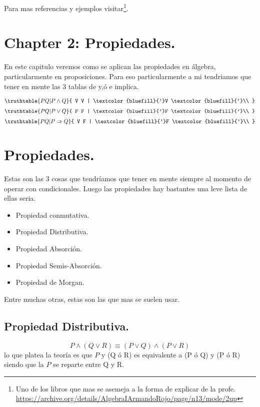 \documentclass{article}
\newcommand{\bs}{\textcolor{bluefill}{'}}
\begin{document}
Para mas referencias y ejemplos visitar\footnote{Uno de los libros que mas se asemeja a la forma de explicar de la profe. \\
\url{https://archive.org/details/AlgebraIArmandoRojo/page/n13/mode/2up}}.



 \section*{Chapter 2: Propiedades.}

En este capitulo veremos como se aplican las propiedades en álgebra, particularmente en proposiciones.
Para eso particularmente a mi tendriamos que tener en mente las 3 tablas de y,ó e implica.

\begin{center}
	\[
	\truthtable{
		P Q | P \land Q
	}{  V V | \bs V \bs \\
	}
	\]
	\[
	\truthtable{
		P Q | P \lor Q
	}{  F F | \bs F \bs \\
	}
	\]
	\[
	\truthtable{
		P Q | P \Rightarrow Q
	}{  V F | \bs F \bs \\
	}
	\]
\end{center}


\section{Propiedades.}
Estas son las 3 cosas que tendríamos que tener en mente siempre al momento de operar con condicionales.
Luego las propiedades hay bastantes una leve lista de ellas seria.

\begin{itemize}
	\item Propiedad conmutativa.
	\item Propiedad Distributiva.
	\item Propiedad Absorción.
	\item Propiedad Semis-Absorción.
	\item Propiedad de Morgan.
\end{itemize}
Entre muchas otras, estas son las que mas se suelen usar.

\subsection*{Propiedad Distributiva.}

\begin{frm-thm}
	\begin{equation*}
		P \land(Q \lor R) \equiv (P \lor Q) \land (P \lor R)
	\end{equation*}
	lo que platea la teoría es que $P$ y (Q ó R) es equivalente a (P ó Q) y (P ó R) siendo que la $P$ se reparte entre Q y R.
\end{frm-thm}
\end{document}
